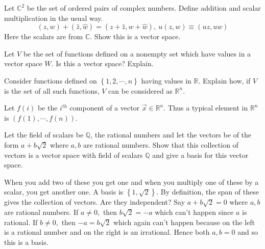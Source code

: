 \documentclass{ximera}
\begin{document}
\begin{problem}\label{prb:10.7} Let $\mathbb{C}^{2}$ be the set of ordered pairs of complex numbers.
Define addition and scalar multiplication in the usual way.
\begin{equation*}
\left( z,w\right) +\left( \hat{z},\hat{w}\right) = \left( z+\hat{z},w+
\hat{w}\right) ,\ u\left( z,w\right) \equiv \left( uz,uw\right)
\end{equation*}
Here the scalars are from $\mathbb{C}$. Show this is a vector space.
\end{problem}

\begin{problem}\label{prb:10.8} Let $V$ be the set of functions defined on a nonempty set which have
values in a vector space $W.$ Is this a vector space? Explain.
\end{problem}

\begin{problem}\label{prb:10.21} Consider functions defined on $\left\{ 1,2,\cdots ,n\right\} $ having
values in $\mathbb{R}$. Explain how, if $V$ is the set of all such
functions, $V$ can be considered as $\mathbb{R}^{n}$.
\begin{hint}
Let $f\left( i\right) $ be the $i^{th}$ component of a vector $
\vec{x}\in \mathbb{R}^{n}$. Thus a typical element in $\mathbb{R}^{n}$ is $
\left( f\left( 1\right) ,\cdots ,f\left( n\right) \right) $.
\end{hint}
\end{problem}

\begin{problem}\label{prb:10.60} Let the field of scalars be $\mathbb{Q}$, the rational numbers and let
the vectors be of the form $a+b\sqrt{2}$ where $a,b$ are rational numbers.
Show that this collection of vectors is a vector space with field of scalars
$\mathbb{Q}$ and give a basis for this vector space.
\begin{hint}
When you add two of these you get one and when you multiply one of these by
a scalar, you get another one. A basis is $\left\{ 1,\sqrt{2}\right\} $. By
definition, the span of these gives the collection of vectors. Are they
independent? Say $a+b\sqrt{2}=0$ where $a,b$ are rational numbers. If $a\neq
0,$ then $b\sqrt{2}=-a$ which can't happen since $a$ is rational. If $b\neq
0,$ then $-a=b\sqrt{2}$ which again can't happen because on the left is a
rational number and on the right is an irrational. Hence both $a,b=0$ and so
this is a basis.
\end{hint}
\end{problem}
\end{document}
